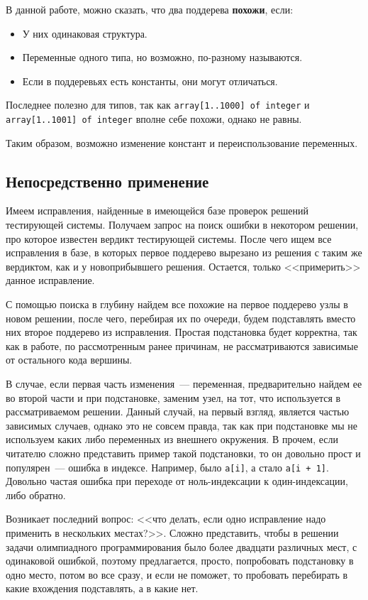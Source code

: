 В данной работе, можно сказать, что два поддерева \textbf{похожи}, если:
\begin{itemize}
    \item У них одинаковая структура.
    \item Переменные одного типа, но возможно, по-разному называются.
    \item Если в поддеревьях есть константы, они могут отличаться.
\end{itemize}
Последнее полезно для типов, так как \texttt{array[1..1000] of integer} и \texttt{array[1..1001] of integer} вполне себе похожи,
однако не равны.

Таким образом, возможно изменение констант и переиспользование переменных.

\subsection{Непосредственно применение}
Имеем исправления, найденные в имеющейся базе проверок решений тестирующей системы. Получаем запрос на поиск ошибки
в некотором решении, про которое известен вердикт тестирующей системы. После чего ищем все исправления в базе, 
в которых первое поддерево вырезано из решения с таким же вердиктом, как и у новоприбывшего решения. Остается, только
<<примерить>> данное исправление.

С помощью поиска в глубину найдем все похожие на первое поддерево узлы в новом решении, после чего, перебирая их по очереди,
будем подставлять вместо них второе поддерево из исправления. Простая подстановка будет корректна, так как в работе, по рассмотренным
ранее причинам, не рассматриваются зависимые от остального кода вершины. 

В случае, если первая часть изменения~--- переменная, предварительно найдем ее во второй части и при подстановке, заменим узел, на тот,
что используется в рассматриваемом решении. Данный случай, на первый взгляд, является частью зависимых случаев, однако это не совсем
правда, так как при подстановке мы не используем каких либо переменных из внешнего окружения. В прочем, если читателю
сложно представить пример такой подстановки, то он довольно прост и популярен~--- ошибка в индексе. Например, было
\texttt{a[i]}, а стало \texttt{a[i + 1]}. Довольно частая ошибка при переходе от ноль-индексации к один-индексации, либо обратно.

Возникает последний вопрос: <<что делать, если одно исправление надо применить в нескольких местах?>>.
Сложно представить, чтобы в решении задачи олимпиадного программирования было более двадцати различных мест, с одинаковой
ошибкой, поэтому предлагается, просто, попробовать подстановку в одно место, потом во все сразу, и если не поможет, то пробовать
перебирать в какие вхождения подставлять, а в какие нет. 

